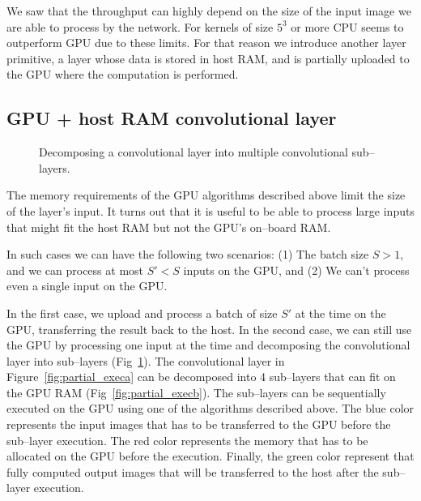 \documentclass[conference]{./IEEEtran/IEEEtran}
\begin{document}
  We saw that the throughput can highly depend on the size of the
  input image we are able to process by the network.  For kernels of
  size $5^3$ or more CPU seems to outperform GPU due to these
  limits.  For that reason we introduce another layer primitive, a
  layer whose data is stored in host RAM, and is partially uploaded to
  the GPU where the computation is performed.

\subsection{GPU + host RAM convolutional layer}

  \begin{figure}
    \centering
    \caption{Decomposing a convolutional layer into multiple
      convolutional sub--layers.}
    \label{fig:partial_exec}
  \end{figure}

  The memory requirements of the GPU algorithms described above limit
  the size of the layer's input.  It turns out that it is useful to be
  able to process large inputs that might fit the host RAM but not the
  GPU's on--board RAM.

  In such cases we can have the following two scenarios: (1) The
  batch size $S > 1$, and we can process at most $S' < S$ inputs
  on the GPU, and (2) We can't process even a single input on the GPU.

  In the first case, we upload and process a batch of size $S'$
  at the time on the GPU, transferring the result back to the host.
  In the second case, we can still use the GPU by processing one input
  at the time and decomposing the convolutional layer into sub--layers
  (Fig~\ref{fig:partial_exec}). The convolutional layer in
  Figure~\ref{fig:partial_execa} can be decomposed into 4 sub--layers
  that can fit on the GPU RAM (Fig~\ref{fig:partial_execb}). The
  sub--layers can be sequentially executed on the GPU using one of the
  algorithms described above.  The blue color represents the input
  images that has to be transferred to the GPU before the sub--layer
  execution.  The red color represents the memory that has to be
  allocated on the GPU before the execution.  Finally, the green color
  represent that fully computed output images that will be transferred
  to the host after the sub--layer execution.
\end{document}

